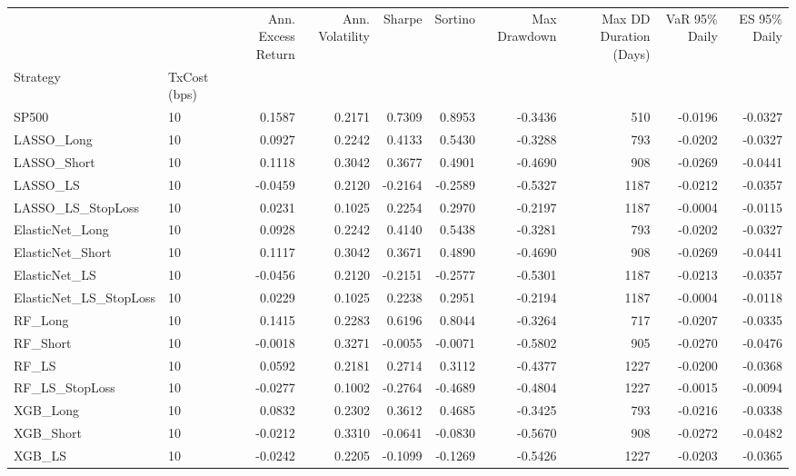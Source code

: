 \begin{tabular}{llrrrrrrrr}
\toprule
 &  & Ann. Excess Return & Ann. Volatility & Sharpe & Sortino & Max Drawdown & Max DD Duration (Days) & VaR 95\% Daily & ES 95\% Daily \\
Strategy & TxCost (bps) &  &  &  &  &  &  &  &  \\
\midrule
SP500 & 10 & 0.1587 & 0.2171 & 0.7309 & 0.8953 & -0.3436 & 510 & -0.0196 & -0.0327 \\
\cline{1-10}
LASSO\_Long & 10 & 0.0927 & 0.2242 & 0.4133 & 0.5430 & -0.3288 & 793 & -0.0202 & -0.0327 \\
\cline{1-10}
LASSO\_Short & 10 & 0.1118 & 0.3042 & 0.3677 & 0.4901 & -0.4690 & 908 & -0.0269 & -0.0441 \\
\cline{1-10}
LASSO\_LS & 10 & -0.0459 & 0.2120 & -0.2164 & -0.2589 & -0.5327 & 1187 & -0.0212 & -0.0357 \\
\cline{1-10}
LASSO\_LS\_StopLoss & 10 & 0.0231 & 0.1025 & 0.2254 & 0.2970 & -0.2197 & 1187 & -0.0004 & -0.0115 \\
\cline{1-10}
ElasticNet\_Long & 10 & 0.0928 & 0.2242 & 0.4140 & 0.5438 & -0.3281 & 793 & -0.0202 & -0.0327 \\
\cline{1-10}
ElasticNet\_Short & 10 & 0.1117 & 0.3042 & 0.3671 & 0.4890 & -0.4690 & 908 & -0.0269 & -0.0441 \\
\cline{1-10}
ElasticNet\_LS & 10 & -0.0456 & 0.2120 & -0.2151 & -0.2577 & -0.5301 & 1187 & -0.0213 & -0.0357 \\
\cline{1-10}
ElasticNet\_LS\_StopLoss & 10 & 0.0229 & 0.1025 & 0.2238 & 0.2951 & -0.2194 & 1187 & -0.0004 & -0.0118 \\
\cline{1-10}
RF\_Long & 10 & 0.1415 & 0.2283 & 0.6196 & 0.8044 & -0.3264 & 717 & -0.0207 & -0.0335 \\
\cline{1-10}
RF\_Short & 10 & -0.0018 & 0.3271 & -0.0055 & -0.0071 & -0.5802 & 905 & -0.0270 & -0.0476 \\
\cline{1-10}
RF\_LS & 10 & 0.0592 & 0.2181 & 0.2714 & 0.3112 & -0.4377 & 1227 & -0.0200 & -0.0368 \\
\cline{1-10}
RF\_LS\_StopLoss & 10 & -0.0277 & 0.1002 & -0.2764 & -0.4689 & -0.4804 & 1227 & -0.0015 & -0.0094 \\
\cline{1-10}
XGB\_Long & 10 & 0.0832 & 0.2302 & 0.3612 & 0.4685 & -0.3425 & 793 & -0.0216 & -0.0338 \\
\cline{1-10}
XGB\_Short & 10 & -0.0212 & 0.3310 & -0.0641 & -0.0830 & -0.5670 & 908 & -0.0272 & -0.0482 \\
\cline{1-10}
XGB\_LS & 10 & -0.0242 & 0.2205 & -0.1099 & -0.1269 & -0.5426 & 1227 & -0.0203 & -0.0365 \\

\end{tabular}

